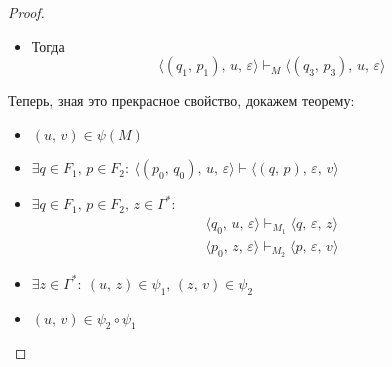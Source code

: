 \documentclass[a4paper,12pt]{article}
\theoremstyle{plain}
\theoremstyle{definition}
\theoremstyle{remark}
\begin{document}
\begin{proof}
\begin{itemize}
\begin{itemize}
			\item Тогда 
			\[
				\langle(q_1,\,p_1),\,u,\,\varepsilon\rangle\vdash_M\langle(q_3,\,p_3),\,u,\,\varepsilon\rangle
			\]
		\end{itemize}
	\end{itemize}
	Теперь, зная это прекрасное свойство, докажем теорему:
	\begin{itemize}
		\item $(u,\, v) \in \psi(M)$
		\item $\exists q \in F_1,\, p \in F_2 :\: \langle(p_0,\,q_0),\,u,\,\varepsilon\rangle\vdash\langle(q,\,p),\,\varepsilon,\,v\rangle$
		\item $\exists q \in F_1,\, p \in F_2,\, z \in \Gamma^*$:
		\begin{align*}
			\langle q_0,\,u,\,\varepsilon\rangle\vdash_{M_1}\langle q,\,\varepsilon,\,z\rangle\\
			\langle p_0,\,z,\,\varepsilon\rangle\vdash_{M_2}\langle p,\,\varepsilon,\,v\rangle
		\end{align*}
		\item $\exists z \in \Gamma^* :\: (u,\,z) \in \psi_1,\, (z,\, v) \in \psi_2$
		\item $(u,\,v) \in \psi_2\circ\psi_1$
	\end{itemize}
\end{proof}
\end{document}
